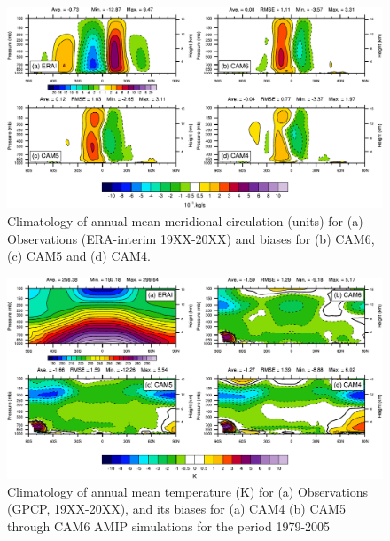 \clearpage
\begin{figure}[t]
  \begin{center}
    \includegraphics[width=1.1\textwidth,angle=0.]{./figs/f_MMC_2D_ANN_CAM456.pdf}
  \end{center}
  \caption{Climatology of annual mean meridional circulation (units) for (a) Observations (ERA-interim 19XX-20XX) and biases for (b) CAM6, (c) CAM5 and (d) CAM4.} 
\label{f_MMC_2D_ANN_CAM456}
\end{figure} 


\clearpage
\begin{figure}[t]
    \includegraphics[width=1.\textwidth,angle=0.]{./figs/f_T_2D_ANN_CAM456.pdf}
  \caption{Climatology of annual mean temperature (K) for (a) Observations (GPCP, 19XX-20XX), and its biases for (a) CAM4 (b) CAM5  through CAM6 AMIP simulations for the period 1979-2005} 
\label{f_T_2D_ANN_CAM456}
\end{figure} 




